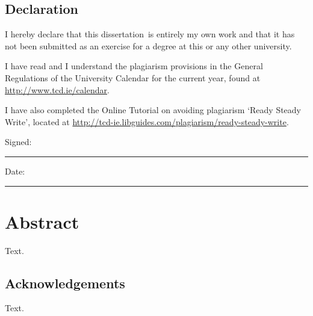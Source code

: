 \documentclass[a4paper,oneside,12pt]{book}
\title{\thesistitle}
\author{\authorname}
\newcommand{\typeofthesis}{dissertation}
\begin{document}

\section*{\Huge{Declaration}}
\vspace{1cm}
I hereby declare that this \typeofthesis\ is entirely my own work and that it has not been submitted as an exercise for a degree at this or any other university.

\vspace{1cm}
I have read and I understand the plagiarism provisions in the General Regulations of the University Calendar for the current year, found at \url{http://www.tcd.ie/calendar}.
\vspace{1cm}

I have also completed the Online Tutorial on avoiding plagiarism `Ready Steady Write', located at \url{http://tcd-ie.libguides.com/plagiarism/ready-steady-write}.
\vspace{3cm}

Signed:~\rule{5cm}{0.3pt}\hfill Date:~\rule{5cm}{0.3pt}

\chapter*{Abstract}

Text.

\newpage
\onehalfspacing\raggedright

\section*{\Huge{Acknowledgements}}

Text.

\tableofcontents
\listoffigures
\listoftables
\lstlistoflistings
\newpage
\end{document}
